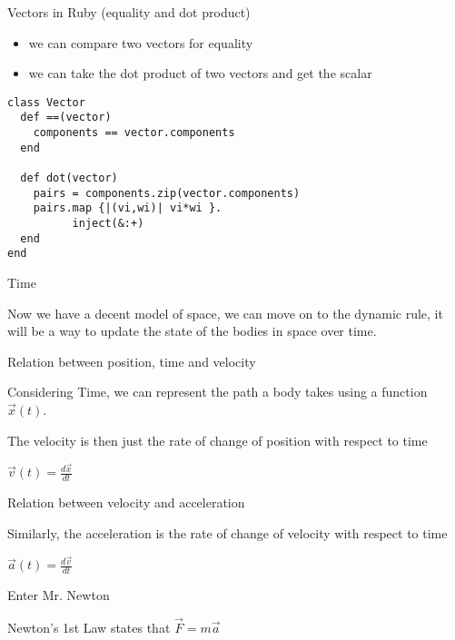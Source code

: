 \documentclass[bigger]{beamer}
\begin{document}
\begin{frame}[fragile,label=sec-18]{Vectors in Ruby (equality and dot product)}
 \begin{itemize}
\item we can compare two vectors for equality
\item we can take the dot product of two vectors and get the scalar
\end{itemize}

\begin{verbatim}
class Vector
  def ==(vector)
    components == vector.components
  end

  def dot(vector)
    pairs = components.zip(vector.components)
    pairs.map {|(vi,wi)| vi*wi }.
          inject(&:+)
  end
end
\end{verbatim}
\end{frame}
\begin{frame}[label=sec-19]{Time}
\begin{block}{Now we have a decent \alert{model of space}, we can move on to the \alert{dynamic rule}, it will be a way to update the state of the bodies in space over time.}
\end{block}
\end{frame}
\begin{frame}[label=sec-20]{Relation between position, time and velocity}
\begin{block}{Considering \alert{Time}, we can represent the path a body takes using a function $\vec{x}(t)$.}
\end{block}

\begin{block}{The velocity is then just the \alert{rate of change of position with respect to time}}
\begin{center}
{\LARGE $\vec{v}(t) = \frac{d\vec{x}}{dt}$}
\end{center}
\end{block}
\end{frame}

\begin{frame}[label=sec-21]{Relation between velocity and acceleration}
\begin{block}{Similarly, the acceleration is the \alert{rate of change of velocity with respect to time}}
\begin{center}
{\LARGE $\vec{a}(t) = \frac{d\vec{v}}{dt}$}
\end{center}
\end{block}
\end{frame}

\begin{frame}[label=sec-22]{Enter Mr. Newton}
\begin{block}{Newton's 1st Law states that $\vec{F} = m\vec{a}$}
\end{block}
\end{frame}
\end{document}

